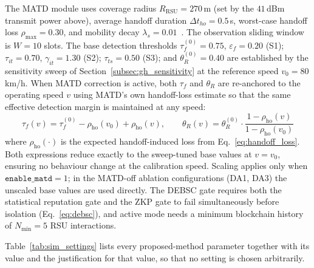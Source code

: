 \documentclass[12pt, a4paper]{report}
\begin{document}
The MATD module uses coverage radius $R_{\text{RSU}}=270$\,m (set by the
$41$\,dBm transmit power above), average handoff duration
$\Delta t_{ho}=0.5$\,s, worst-case handoff loss $\rho_{\max}=0.30$, and mobility
decay $\lambda_s=0.01$~\cite{islam2021sdvn}. The observation sliding window is
$W=10$ slots. The base detection thresholds $\tau_f^{(0)}=0.75$,
$\varepsilon_f=0.20$ (S1); $\tau_{it}=0.70$, $\gamma_{it}=1.30$ (S2);
$\tau_{ts}=0.50$ (S3); and $\theta_R^{(0)}=0.40$ are established
by the sensitivity sweep of Section~\ref{subsec:gh_sensitivity}
at the reference speed $v_0=80$\,km/h. When MATD correction is
active, both $\tau_f$ and $\theta_R$ are re-anchored to the
operating speed $v$ using MATD's own handoff-loss estimate so that
the same effective detection margin is maintained at any speed:
\begin{equation}
\label{eq:scaled_tau}
\tau_f(v) =
\tau_f^{(0)} - \rho_{\mathrm{ho}}(v_0) + \rho_{\mathrm{ho}}(v),
\qquad
\theta_R(v) =
\theta_R^{(0)} \cdot
\frac{1 - \rho_{\mathrm{ho}}(v)}{1 - \rho_{\mathrm{ho}}(v_0)}
\end{equation}
where $\rho_{\mathrm{ho}}(\cdot)$ is the expected handoff-induced loss
from Eq.~\eqref{eq:handoff_loss}. Both expressions reduce exactly to
the sweep-tuned base values at $v=v_0$, ensuring no behaviour
change at the calibration speed. Scaling applies only when
$\texttt{enable\_matd}=1$; in the MATD-off ablation configurations
(DA1, DA3) the unscaled base values are used directly. The DEBSC gate requires both the statistical
reputation gate and the ZKP gate to fail simultaneously before isolation
(Eq.~\eqref{eq:debsc}), and active mode needs a minimum blockchain history of
$N_{\text{min}}=5$ RSU interactions.

Table~\ref{tab:sim_settings} lists every proposed-method parameter together with
its value and the justification for that value, so that no setting is chosen
arbitrarily.
\end{document}
